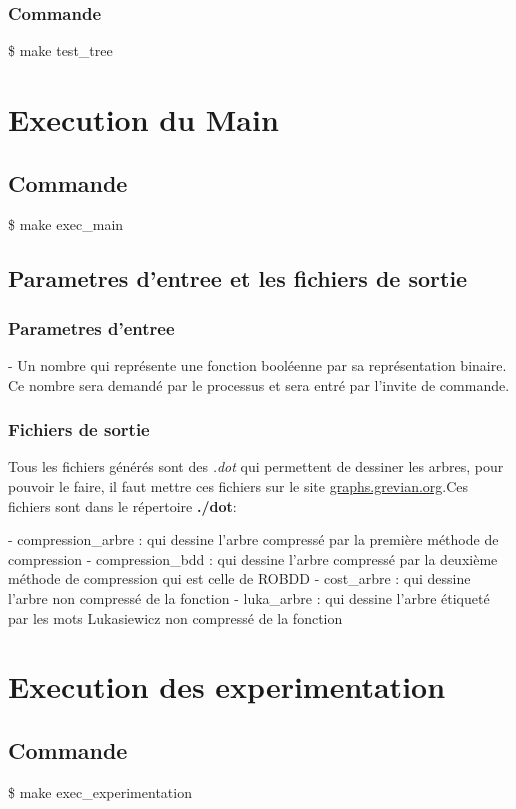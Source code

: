 \documentclass{article}
\begin{document}
\subsubsection{Commande}
\tabto{1cm}\$ make test\_tree

\section{Execution du Main}

\subsection{Commande}
\tabto{1cm}\$ make exec\_main

\subsection{Parametres d'entree et les fichiers de sortie}
\subsubsection{Parametres d'entree}
\tabto{1cm}- Un nombre qui représente une fonction booléenne par sa représentation binaire. Ce nombre sera demandé par le processus et sera entré par l'invite de commande.

\subsubsection{Fichiers de sortie}
\tabto{2cm} Tous les fichiers générés sont des \textit{.dot} qui permettent de dessiner les arbres, pour pouvoir le faire, il faut mettre ces fichiers sur le site \href{https://graphs.grevian.org/graph}{graphs.grevian.org}.Ces fichiers sont dans le répertoire \textbf{./dot}: 

\tabto{1cm} -  compression\_arbre : qui dessine l'arbre compressé par la première méthode de compression
\tabto{1cm} -  compression\_bdd : qui dessine l'arbre compressé par la deuxième méthode de compression qui est celle de ROBDD
\tabto{1cm} -  cost\_arbre : qui dessine l'arbre non compressé de la fonction 
\tabto{1cm} -  luka\_arbre : qui dessine l'arbre étiqueté par les mots Lukasiewicz non compressé de la fonction


\section{Execution des experimentation}

\subsection{Commande}
\tabto{1cm}\$ make exec\_experimentation
\end{document}

